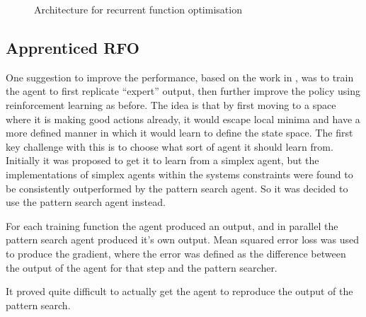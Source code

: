 \begin{figure}
\centering

\caption{Architecture for recurrent function optimisation}
\label{fig:RFOarch}
\end{figure}

\subsection{Apprenticed RFO}
One suggestion to improve the performance, based on the work in \cite{alphaGO}, was to train the agent to first replicate ``expert'' output, then further improve the policy using reinforcement learning as before. The idea is that by first moving to a space where it is making good actions already, it would escape local minima and have a more defined manner in which it would learn to define the state space. The first key challenge with this is to choose what sort of agent it should learn from. Initially it was proposed to get it to learn from a simplex agent, but the implementations of simplex agents within the systems constraints were found to be consistently outperformed by the pattern search agent. So it was decided to use the pattern search agent instead. 

For each training function the agent produced an output, and in parallel the pattern search agent produced it's own output. Mean squared error loss was used to produce the gradient, where the error was defined as the difference between the output of the agent for that step and the pattern searcher.

It proved quite difficult to actually get the agent to reproduce the output of the pattern search. %



